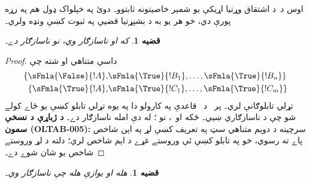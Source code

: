 \documentclass[12pt,a4paper,oneside]{report}
\newcommand{\olfileid}[3]{\gdef\pspart{#1}\gdef\pschapter{#2}\gdef\pssection{#3}}
\gdef\pspart{#2}\gdef\pschapter{#3}\gdef\pssection{}%
\newcommand{\ollabel}[1]{\label{\pspart:\pschapter:\pssection:#1}}
\newtheorem{prop}[thm]{قضيه}
\theoremstyle{definition}
\begin{document}
\label{olpseg:OLP-0106-B004:start}
\olfileid{fol}{tab}{prv}
\label{olpseg:OLP-0106-B004:end}

\label{olpseg:OLP-0106-B005:start}
\label{olpseg:OLP-0106-B005:end}

\label{olpseg:OLP-0106-B006:start}
اوس د~د اشتقاق وړتيا اړيکې يو شمېر خاصيتونه ثابتوو۔ دوئ په
خپلواک ډول هم په زړه پورې دي، خو هر يو به د بشپړتيا قضیې په ثبوت
کښې ونډه ولري۔
\label{olpseg:OLP-0106-B006:end}

\label{olpseg:OLP-0106-B007:start}
\begin{prop}\ollabel{prop:provability-contr}
  که  او  ناسازګار وي،
  نو \LR{$\Gamma$} ناسازګار دے۔
\end{prop}
\label{olpseg:OLP-0106-B007:end}

\label{olpseg:OLP-0106-B008:start}
\begin{proof}
داسې متناهي
 او
 شته چې
  \begin{align*}
    \{\sFmla{\False}{!A}, &
    \sFmla{\True}{!B_1}, \dots, \sFmla{\True}{!B_n}\} \\
    \{\sFmla{\True}{!A}, &
    \sFmla{\True}{!C_1}, \dots, \sFmla{\True}{!C_m}\}
  \end{align*}
  تړلي تابلوګانې لري۔ پر~ د~\Cut{} قاعدې په کارولو دا په
  يوه تړلي تابلو کښې يو ځاے کولے شو چې د
   ناسازګاري ښيي۔ ځکه
  \LR{$\Gamma_0 \subseteq \Gamma$} او~\LR{$\Gamma_1 \subseteq \Gamma$}،
  نو \LR{$\Gamma_0 \cup \Gamma_1 \subseteq \Gamma$}؛ له دې امله
  \LR{$\Gamma$} ناسازګار دے۔
\textbf{د ژباړې د نسخې سمون (OLTAB-005):} سرچينه د دويم متناهي
سټ په تعريف کښې لړ په اېن شاخص پاے ته رسوي، خو په تابلو کښې ئې
وروستے غړے د اېم شاخص لري؛ دلته د لړ وروستے شاخص يو شان شوے دے۔
\end{proof}
\label{olpseg:OLP-0106-B008:end}

\label{olpseg:OLP-0106-B009:start}
\begin{prop}
\ollabel{prop:prov-incons}
 هله او يوازې هله چې
 ناسازګار وي۔
\end{prop}
\label{olpseg:OLP-0106-B009:end}
\end{document}
